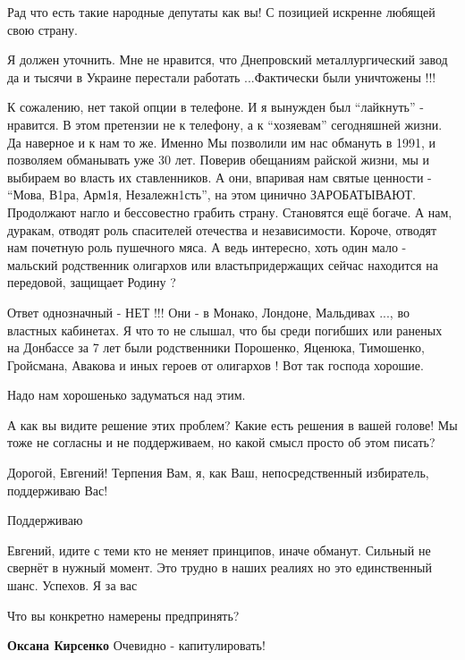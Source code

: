 \begin{itemize}
Рад что есть такие народные депутаты как вы! С позицией искренне любящей свою страну.


Я должен уточнить. Мне не нравится, что Днепровский металлургический завод да и
тысячи в Украине перестали работать ...Фактически были уничтожены !!!

К сожалению, нет такой опции в телефоне. И я вынужден был \enquote{лайкнуть} -
нравится. В этом претензии не к телефону, а к \enquote{хозяевам} сегодняшней
жизни. Да наверное и к нам то же. Именно Мы позволили им нас обмануть в 1991, и
позволяем обманывать уже 30 лет. Поверив обещаниям райской жизни, мы и выбираем
во власть их ставленников. А они, впаривая нам святые ценности - \enquote{Мова,
В1ра, Арм1я, Незалежн1сть}, на этом цинично ЗАРОБАТЫВАЮТ. Продолжают нагло и
бессовестно грабить страну. Становятся ещё богаче. А нам, дуракам, отводят роль
спасителей отечества и независимости. Короче, отводят нам почетную роль
пушечного мяса. А ведь интересно, хоть один мало - мальский родственник
олигархов или властьпридержащих сейчас находится на передовой, защищает Родину
?

Ответ однозначный - НЕТ !!! Они - в Монако, Лондоне, Мальдивах ..., во властных
кабинетах. Я что то не слышал, что бы среди погибших или раненых на Донбассе за
7 лет были родственники Порошенко, Яценюка, Тимошенко, Гройсмана, Авакова и
иных героев от олигархов ! Вот так господа хорошие.

Надо нам хорошенько задуматься над этим.


А как вы видите решение этих проблем? Какие есть решения в вашей голове! Мы
тоже не согласны и не поддерживаем, но какой смысл просто об этом писать?

Дорогой, Евгений! Терпения Вам, я, как Ваш, непосредственный избиратель, поддерживаю Вас!

Поддерживаю


Евгений, идите с теми кто не меняет принципов, иначе обманут. Сильный не
свернёт в нужный момент. Это трудно в наших реалиях но это единственный шанс.
Успехов. Я за вас

Что вы конкретно намерены предпринять?

\begin{itemize} %
\textbf{Оксана Кирсенко} Очевидно - капитулировать!


\end{itemize}
\end{itemize}
